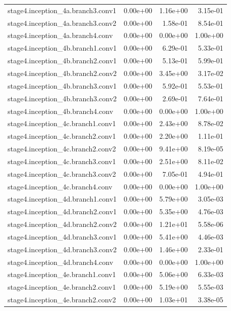 \begin{longtable}{lrrr}
stage4.inception_4a.branch3.conv1 & 0.00e+00 & 1.16e+00 & 3.15e-01 \\
stage4.inception_4a.branch3.conv2 & 0.00e+00 & 1.58e-01 & 8.54e-01 \\
stage4.inception_4a.branch4.conv & 0.00e+00 & 0.00e+00 & 1.00e+00 \\
stage4.inception_4b.branch1.conv1 & 0.00e+00 & 6.29e-01 & 5.33e-01 \\
stage4.inception_4b.branch2.conv1 & 0.00e+00 & 5.13e-01 & 5.99e-01 \\
stage4.inception_4b.branch2.conv2 & 0.00e+00 & 3.45e+00 & 3.17e-02 \\
stage4.inception_4b.branch3.conv1 & 0.00e+00 & 5.92e-01 & 5.53e-01 \\
stage4.inception_4b.branch3.conv2 & 0.00e+00 & 2.69e-01 & 7.64e-01 \\
stage4.inception_4b.branch4.conv & 0.00e+00 & 0.00e+00 & 1.00e+00 \\
stage4.inception_4c.branch1.conv1 & 0.00e+00 & 2.43e+00 & 8.78e-02 \\
stage4.inception_4c.branch2.conv1 & 0.00e+00 & 2.20e+00 & 1.11e-01 \\
stage4.inception_4c.branch2.conv2 & 0.00e+00 & 9.41e+00 & 8.19e-05 \\
stage4.inception_4c.branch3.conv1 & 0.00e+00 & 2.51e+00 & 8.11e-02 \\
stage4.inception_4c.branch3.conv2 & 0.00e+00 & 7.05e-01 & 4.94e-01 \\
stage4.inception_4c.branch4.conv & 0.00e+00 & 0.00e+00 & 1.00e+00 \\
stage4.inception_4d.branch1.conv1 & 0.00e+00 & 5.79e+00 & 3.05e-03 \\
stage4.inception_4d.branch2.conv1 & 0.00e+00 & 5.35e+00 & 4.76e-03 \\
stage4.inception_4d.branch2.conv2 & 0.00e+00 & 1.21e+01 & 5.58e-06 \\
stage4.inception_4d.branch3.conv1 & 0.00e+00 & 5.41e+00 & 4.46e-03 \\
stage4.inception_4d.branch3.conv2 & 0.00e+00 & 1.46e+00 & 2.33e-01 \\
stage4.inception_4d.branch4.conv & 0.00e+00 & 0.00e+00 & 1.00e+00 \\
stage4.inception_4e.branch1.conv1 & 0.00e+00 & 5.06e+00 & 6.33e-03 \\
stage4.inception_4e.branch2.conv1 & 0.00e+00 & 5.19e+00 & 5.55e-03 \\
stage4.inception_4e.branch2.conv2 & 0.00e+00 & 1.03e+01 & 3.38e-05 \\

\end{longtable}
